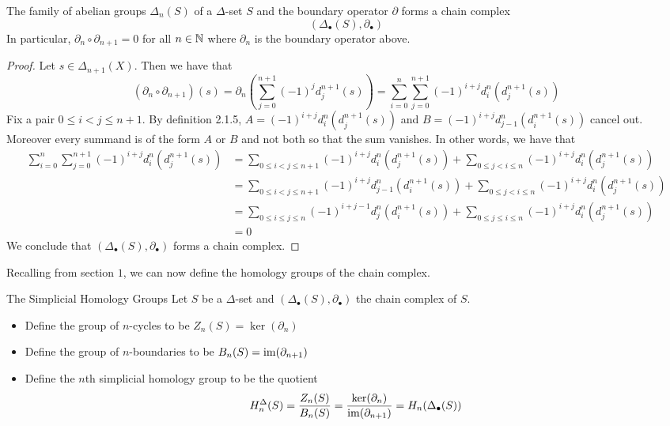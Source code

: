 \documentclass[a4paper]{article}
\begin{document}
\begin{prp}{}{} The family of abelian groups $\Delta_n(S)$ of a $\Delta$-set $S$ and the boundary operator $\partial$ forms a chain complex $$(\Delta_\bullet(S),\partial_\bullet)$$ In particular, $\partial_n\circ\partial_{n+1}=0$ for all $n\in\mathbb{N}$ where $\partial_n$ is the boundary operator above. \tcbline
\begin{proof}
Let $s\in\Delta_{n+1}(X)$. Then we have that $$(\partial_n\circ\partial_{n+1})(s)=\partial_n\left(\sum_{j=0}^{n+1}(-1)^jd_j^{n+1}(s)\right)=\sum_{i=0}^n\sum_{j=0}^{n+1}(-1)^{i+j}d_i^n(d_j^{n+1}(s))$$ Fix a pair $0\leq i<j\leq n+1$. By definition 2.1.5, $A=(-1)^{i+j}d_i^n(d_j^{n+1}(s))$ and $B=(-1)^{i+j}d_{j-1}^n(d_i^{n+1}(s))$ cancel out. Moreover every summand is of the form $A$ or $B$ and not both so that the sum vanishes. In other words, we have that 
\begin{align*}
\sum_{i=0}^n\sum_{j=0}^{n+1}(-1)^{i+j}d_i^n(d_j^{n+1}(s))&=\sum_{0\leq i<j\leq n+1}(-1)^{i+j}d_i^n(d_j^{n+1}(s))+\sum_{0\leq j<i\leq n}(-1)^{i+j}d_i^n(d_j^{n+1}(s))\\
&=\sum_{0\leq i<j\leq n+1}(-1)^{i+j}d_{j-1}^n(d_i^{n+1}(s))+\sum_{0\leq j<i\leq n}(-1)^{i+j}d_i^n(d_j^{n+1}(s))\\
&=\sum_{0\leq i\leq j\leq n}(-1)^{i+j-1}d_j^n(d_i^{n+1}(s))+\sum_{0\leq j\leq i\leq n}(-1)^{i+j}d_i^n(d_j^{n+1}(s))\\
&=0
\end{align*}
We conclude that $(\Delta_\bullet(S),\partial_\bullet)$ forms a chain complex. 
\end{proof}
\end{prp}

Recalling from section $1$, we can now define the homology groups of the chain complex. 

\begin{defn}{The Simplicial Homology Groups}{} Let $S$ be a $\Delta$-set and $(\Delta_\bullet(S),\partial_\bullet)$ the chain complex of $S$. 
\begin{itemize}
\item Define the group of $n$-cycles to be $Z_n(S)=\ker(\partial_n)$
\item Define the group of $n$-boundaries to be $B_n(S)=\operatorname{im}(\partial_{n+1})$
\item Define the $n$th simplicial homology group to be the quotient $$H_n^\Delta(S)=\frac{Z_n(S)}{B_n(S)}=\frac{\ker(\partial_n)}{\operatorname{im}(\partial_{n+1})}=H_n(\Delta_\bullet(S))$$
\end{itemize}
\end{defn}
\end{document}

